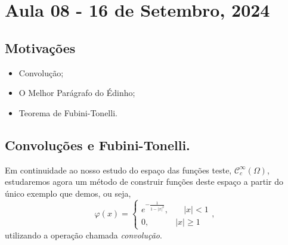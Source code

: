 \documentclass[../distribution_theory_notes.tex]{subfiles}
\begin{document}
\section{Aula 08 - 16 de Setembro, 2024}
\subsection{Motivações}
\begin{itemize}
	\item Convolução;
	\item O Melhor Parágrafo do Édinho;
	\item Teorema de Fubini-Tonelli.
\end{itemize}
\subsection{Convoluções e Fubini-Tonelli.}
Em continuidade ao nosso estudo do espaço das funções teste, \(\mathcal{C}_{c}^{\infty}(\Omega )\), estudaremos agora um método de construir funções deste espaço a partir do único exemplo que demos, ou seja,
\[
	\varphi (x) = \left\{\begin{array}{ll}
		e^{-\frac{1}{1-|x|^{2}}}, & \quad |x|<1 \\
		0,                        & |x|\geq 1
	\end{array}\right.,
\]
utilizando a operação chamada \textit{convolução}.
\end{document}
